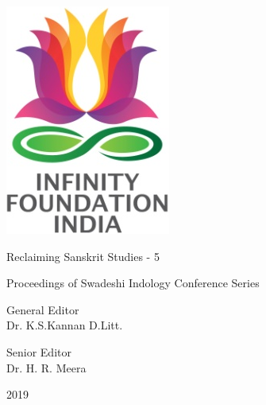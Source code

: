 \thispagestyle{empty}

\includegraphics{images/logo.png}

Reclaiming Sanskrit Studies - 5


Proceedings of Swadeshi Indology Conference Series

General Editor\\ Dr. K.S.Kannan D.Litt.

Senior Editor\\ Dr. H. R. Meera


2019

